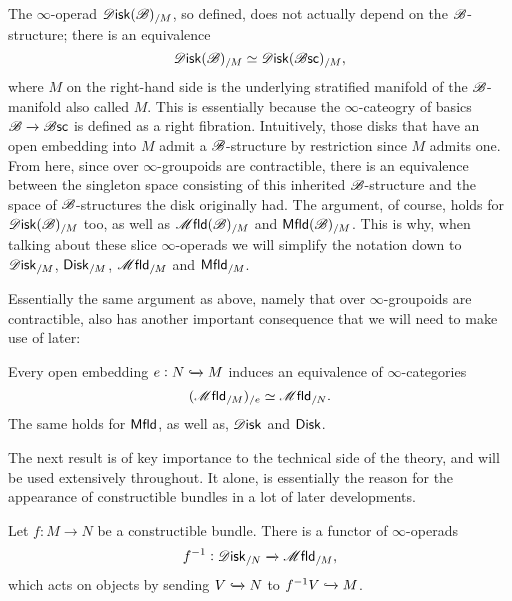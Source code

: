 \documentclass[../text]{subfiles}
\begin{document}
\begin{remark}\label{rem:disk_b=disk_bsc}
    The $\infty$-operad $\disk(\bstr)_{/M}$, so defined, does not actually depend on the $\mathscr{B}$-structure; there is an equivalence
    \begin{equation}
        \disk(\bstr)_{/M} \simeq \disk(\bsc)_{/M},
    \end{equation}
    where $M$ on the right-hand side is the underlying stratified manifold of the $\mathscr{B}$-manifold also called $M$. This is essentially because the $\infty$-cateogry of basics $\mathscr{B} \xrightarrow{} \mathscr{B} \mathsf{sc}$ is defined as a right fibration. Intuitively, those disks that have an open embedding into $M$ admit a $\mathscr{B}$-structure by restriction since $M$ admits one. From here, since over $\infty$-groupoids are contractible, there is an equivalence between the singleton space consisting of this inherited $\mathscr{B}$-structure and the space of $\mathscr{B}$-structures the disk originally had. The argument, of course, holds for $\disk(\bstr)_{/M}$ too, as well as $\mfld(\bstr)_{/M}$ and $\mfld[r](\bstr)_{/M}$. This is why, when talking about these slice $\infty$-operads we will simplify the notation down to $\disk_{/M}$, $\disk[r]_{/M}$, $\mfld_{/M}$ and $\mfld[r]_{/M}$.
\end{remark}

Essentially the same argument as above, namely that over $\infty$-groupoids are contractible, also has another important consequence that we will need to make use of later:

\begin{lemma}\label{lem:double_slice}
    Every open embedding $e: N \xhookrightarrow{} M$ induces an equivalence of $\infty$-categories
    \begin{equation}
        (\mfld_{/M})_{/e} \simeq \mfld_{/N}.
    \end{equation}
    The same holds for $\mfld[r]$, as well as, $\disk$ and $\disk[r]$.
\end{lemma}

The next result is of key importance to the technical side of the theory, and will be used extensively throughout. It alone, is essentially the reason for the appearance of constructible bundles in a lot of later developments.

\begin{lemma}\label{lem:f^-1}
    Let $f: M \xrightarrow{} N$ be a constructible bundle. There is a functor of $\infty$-operads
    \begin{equation}
        f^{-1}: \disk_{/N} \xrightarrow{} \mfld_{/M},
    \end{equation}
    which acts on objects by sending $V \xhookrightarrow{} N$ to $f^{-1}V \xhookrightarrow{} M$.
\end{lemma}
\end{document}
